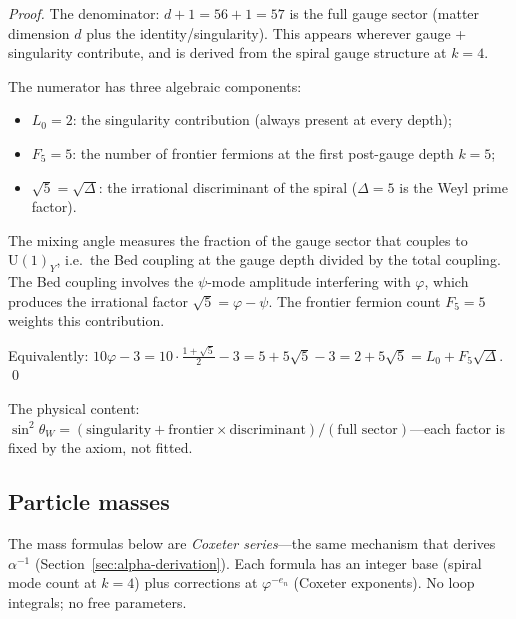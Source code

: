 \documentclass[12pt,a4paper]{article}
\begin{document}
\begin{proof}
The denominator: $d + 1 = 56 + 1 = 57$ is the full gauge sector (matter dimension $d$ plus the identity/singularity).  This appears wherever gauge + singularity contribute, and is derived from the spiral gauge structure at $k = 4$.

The numerator has three algebraic components:
\begin{itemize}
\item $L_0 = 2$: the singularity contribution (always present at every depth);
\item $F_5 = 5$: the number of frontier fermions at the first post-gauge depth $k = 5$;
\item $\sqrt{5} = \sqrt{\Delta}$: the irrational discriminant of the spiral ($\Delta = 5$ is the Weyl prime factor).
\end{itemize}
The mixing angle measures the fraction of the gauge sector that couples to $\mathrm{U}(1)_Y$, i.e.\ the Bed coupling at the gauge depth divided by the total coupling.  The Bed coupling involves the $\psi$-mode amplitude interfering with $\varphi$, which produces the irrational factor $\sqrt{5} = \varphi - \psi$.  The frontier fermion count $F_5 = 5$ weights this contribution.

Equivalently: $10\varphi - 3 = 10\cdot\tfrac{1+\sqrt{5}}{2} - 3 = 5 + 5\sqrt{5} - 3 = 2 + 5\sqrt{5} = L_0 + F_5\sqrt{\Delta}$.  \qed
\end{proof}

The physical content: $\sin^2\theta_W = (\text{singularity} + \text{frontier} \times \text{discriminant})/(\text{full sector})$---each factor is fixed by the axiom, not fitted.

\subsection{Particle masses}
\label{sec:particle-masses}

The mass formulas below are \emph{Coxeter series}---the same mechanism that derives $\alpha^{-1}$ (Section~\ref{sec:alpha-derivation}).  Each formula has an integer base (spiral mode count at $k = 4$) plus corrections at $\varphi^{-e_n}$ (Coxeter exponents).  No loop integrals; no free parameters.
\end{document}
